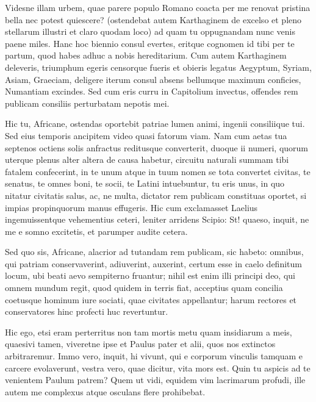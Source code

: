  Videsne illam urbem, quae parere populo Romano coacta per me renovat pristina bella nec potest quiescere? (ostendebat autem Karthaginem de excelso et pleno stellarum illustri et claro quodam loco) ad quam tu oppugnandam nunc venis paene miles. Hanc hoc biennio consul evertes, eritque cognomen id tibi per te partum, quod habes adhuc a nobis hereditarium. Cum autem Karthaginem deleveris, triumphum egeris censorque fueris et obieris legatus Aegyptum, Syriam, Asiam, Graeciam, deligere iterum consul absens bellumque maximum conficies, Numantiam excindes. Sed cum eris curru in Capitolium invectus, offendes rem publicam consiliis perturbatam nepotis mei.

 Hic tu, Africane, ostendas oportebit patriae lumen animi, ingenii consiliique tui. Sed eius temporis ancipitem video quasi fatorum viam. Nam cum aetas tua septenos octiens solis anfractus reditusque converterit, duoque ii numeri, quorum uterque plenus alter altera de causa habetur, circuitu naturali summam tibi fatalem confecerint, in te unum atque in tuum nomen se tota convertet civitas, te senatus, te omnes boni, te socii, te Latini intuebuntur, tu eris unus, in quo nitatur civitatis salus, ac, ne multa, dictator rem publicam constituas oportet, si impias propinquorum manus effugeris. Hic cum exclamasset Laelius ingemuissentque vehementius ceteri, leniter arridens Scipio: St! quaeso, inquit, ne me e somno excitetis, et parumper audite cetera.

 Sed quo sis, Africane, alacrior ad tutandam rem publicam, sic habeto: omnibus, qui patriam conservaverint, adiuverint, auxerint, certum esse in caelo definitum locum, ubi beati aevo sempiterno fruantur; nihil est enim illi principi deo, qui omnem mundum regit, quod quidem in terris fiat, acceptius quam concilia coetusque hominum iure sociati, quae civitates appellantur; harum rectores et conservatores hinc profecti huc revertuntur.

 Hic ego, etsi eram perterritus non tam mortis metu quam insidiarum a meis, quaesivi tamen, viveretne ipse et Paulus pater et alii, quos nos extinctos arbitraremur. Immo vero, inquit, hi vivunt, qui e corporum vinculis tamquam e carcere evolaverunt, vestra vero, quae dicitur, vita mors est. Quin tu aspicis ad te venientem Paulum patrem? Quem ut vidi, equidem vim lacrimarum profudi, ille autem me complexus atque osculans flere prohibebat.

